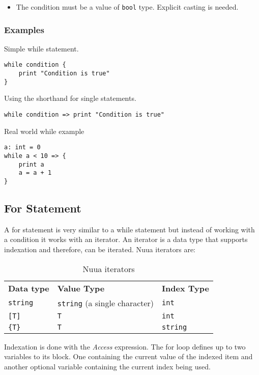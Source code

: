 \begin{itemize}
    \item The condition must be a value of \texttt{bool} type. Explicit casting is needed.
\end{itemize}

\subsubsection{Examples}

Simple while statement.
\begin{lstlisting}
while condition {
    print "Condition is true"
}
\end{lstlisting}
Using the shorthand for single statements.
\begin{lstlisting}
while condition => print "Condition is true"
\end{lstlisting}
Real world while example
\begin{lstlisting}
a: int = 0
while a < 10 => {
    print a
    a = a + 1
}
\end{lstlisting}

\subsection{For Statement}

A for statement is very similar to a while statement but instead of working with a condition it works with an iterator.
An iterator is a data type that supports indexation and therefore, can be iterated. Nuua iterators are:

\begin{table}[H]
    \centering
    \begin{tabular}{ l l l }
        \textbf{Data type} & \textbf{Value Type} & \textbf{Index Type} \\
        \texttt{string} & \texttt{string} (a single character) & \texttt{int} \\
        \texttt{[T]}& \texttt{T} & \texttt{int} \\
        \texttt{\{T\}} & \texttt{T} & \texttt{string} \\
    \end{tabular}
    \caption{Nuua iterators}
    \label{fig:nuua_iterators}
\end{table}

Indexation is done with the \emph{Access} expression.
The for loop defines up to two variables to its block. One containing the current value of the indexed item and
another optional variable containing the current index being used.

